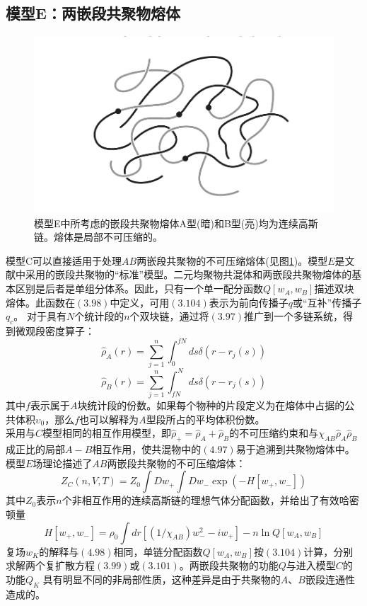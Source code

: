 \subsection{模型E：两嵌段共聚物熔体}

\begin{figure}[H]
	\centering   
	\includegraphics[width=12cm]{./figures/2.png}
	\caption{模型E中所考虑的嵌段共聚物熔体A型(暗)和B型(亮)均为连续高斯链。熔体是局部不可压缩的。}
	\label{模型E}
\end{figure}
模型C可以直接适用于处理$AB$两嵌段共聚物的不可压缩熔体(见图\ref{模型E})。模型$E$是文献中采用的嵌段共聚物的“标准”模型。二元均聚物共混体和两嵌段共聚物熔体的基本区别是后者是单组分体系。因此，只有一个单一配分函数$Q[w_{A},w_{B}]$描述双块熔体。此函数在$(3.98)$中定义，可用$(3.104)$表示为前向传播子$q$或“互补”传播子$q_{c}$。 对于具有$N$个统计段的$n$个双块链，通过将$(3.97)$推广到一个多链系统，得到微观段密度算子：\\
\begin{equation}
\hat{ \rho }_{A}(r)=\sum_{j=1}^{n} \int _{0}^{fN} d s \delta (r-r_{j}(s))
\end{equation}
\begin{equation}
\hat{ \rho }_{B}(r)=\sum_{j=1}^{n} \int _{fN}^{N} d s \delta (r-r_{j}(s))
\end{equation}
其中$f$表示属于$A$块统计段的份数。如果每个物种的片段定义为在熔体中占据的公共体积$\upsilon_0$，那么$f$也可以解释为$A$型段所占的平均体积份数。\\

采用与$C$模型相同的相互作用模型，即$\hat{\rho}_{+}=\hat{\rho}_{A}+\hat{\rho}_{B}$的不可压缩约束和与$\chi_{AB} \hat{\rho}_{A} \hat{\rho}_{B}$成正比的局部$A-B$相互作用，使共混物中的$(4.97)$易于追溯到共聚物熔体中。模型$E$场理论描述了$AB$两嵌段共聚物的不可压缩熔体：\\
\begin{equation}
Z_{C}(n,V,T)=Z_{0} \int D w_{+} \int D w_{-} \exp (-H[w_{+},w_{-}])
\end{equation}
其中$Z_0$表示$n$个非相互作用的连续高斯链的理想气体分配函数，并给出了有效哈密顿量\\
\begin{equation}
H[ w_{+}, w_{-}]= \rho_{0} \int dr [(1/\chi_{AB})w_{-}^{2}-i w_{+}]-n \ln Q[w_{A},w_{B}]
\end{equation}
复场$w_{K}$的解释与$(4.98)$相同，单链分配函数$Q[w_{A},w_{B}]$按$(3.104)$计算，分别求解两个复扩散方程$(3.99)$或$(3.101)$。两嵌段共聚物的功能$Q$与进入模型$C$的功能$Q_{K}$ 具有明显不同的非局部性质，这种差异是由于共聚物的$A$、$B$嵌段连通性造成的。\\

